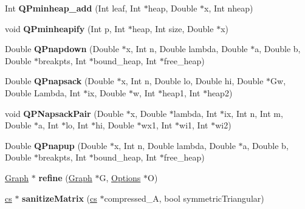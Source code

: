 \begin{DoxyCompactItemize}
\item 
\hypertarget{namespace_mongoose_a65995cc4204b411034064d3829ca7bf4}{}\label{namespace_mongoose_a65995cc4204b411034064d3829ca7bf4} 
Int {\bfseries Q\+Pminheap\+\_\+add} (Int leaf, Int $\ast$heap, Double $\ast$x, Int nheap)
\item 
\hypertarget{namespace_mongoose_ae2703e4fd40288470eeb09de4bd1d62f}{}\label{namespace_mongoose_ae2703e4fd40288470eeb09de4bd1d62f} 
void {\bfseries Q\+Pminheapify} (Int p, Int $\ast$heap, Int size, Double $\ast$x)
\item 
\hypertarget{namespace_mongoose_a468a4bf76df0ae46d77bee17720143a7}{}\label{namespace_mongoose_a468a4bf76df0ae46d77bee17720143a7} 
Double {\bfseries Q\+Pnapdown} (Double $\ast$x, Int n, Double lambda, Double $\ast$a, Double b, Double $\ast$breakpts, Int $\ast$bound\+\_\+heap, Int $\ast$free\+\_\+heap)
\item 
\hypertarget{namespace_mongoose_a1927999799d3dd3c407e506b8d2e06b1}{}\label{namespace_mongoose_a1927999799d3dd3c407e506b8d2e06b1} 
Double {\bfseries Q\+Pnapsack} (Double $\ast$x, Int n, Double lo, Double hi, Double $\ast$Gw, Double Lambda, Int $\ast$ix, Double $\ast$w, Int $\ast$heap1, Int $\ast$heap2)
\item 
\hypertarget{namespace_mongoose_a21a617476ce666abb7981d0d0772e5fe}{}\label{namespace_mongoose_a21a617476ce666abb7981d0d0772e5fe} 
void {\bfseries Q\+P\+Napsack\+Pair} (Double $\ast$x, Double $\ast$lambda, Int $\ast$ix, Int n, Int m, Double $\ast$a, Int $\ast$lo, Int $\ast$hi, Double $\ast$wx1, Int $\ast$wi1, Int $\ast$wi2)
\item 
\hypertarget{namespace_mongoose_a8d5909c500f409018f6d9811aed16464}{}\label{namespace_mongoose_a8d5909c500f409018f6d9811aed16464} 
Double {\bfseries Q\+Pnapup} (Double $\ast$x, Int n, Double lambda, Double $\ast$a, Double b, Double $\ast$breakpts, Int $\ast$bound\+\_\+heap, Int $\ast$free\+\_\+heap)
\item 
\hypertarget{namespace_mongoose_a9c7b6c5f611ca4e8c3cf16ee9af28c1e}{}\label{namespace_mongoose_a9c7b6c5f611ca4e8c3cf16ee9af28c1e} 
\hyperlink{class_mongoose_1_1_graph}{Graph} $\ast$ {\bfseries refine} (\hyperlink{class_mongoose_1_1_graph}{Graph} $\ast$G, \hyperlink{struct_mongoose_1_1_options}{Options} $\ast$O)
\item 
\hypertarget{namespace_mongoose_adceb5c6c9c7b4d5507d0bf035afa7c17}{}\label{namespace_mongoose_adceb5c6c9c7b4d5507d0bf035afa7c17} 
\hyperlink{struct_mongoose_1_1cs__sparse}{cs} $\ast$ {\bfseries sanitize\+Matrix} (\hyperlink{struct_mongoose_1_1cs__sparse}{cs} $\ast$compressed\+\_\+A, bool symmetric\+Triangular)

\end{DoxyCompactItemize}
